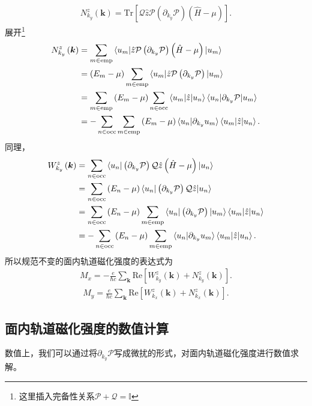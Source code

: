 \documentclass[10pt, oneside]{article}
\newcommand{\pa}{\partial}
\newcommand{\mr}[1]{\mathrm{#1}}
\newcommand{\p}[1]{\left(#1\right)}
\newcommand{\bb}[1]{\left[#1\right]}
\begin{document}
\begin{align}
	\boxed{
			N^{z}_{k_y} \p{\bm{k}} = \mr{Tr} \bb{\mathcal{Q} \hat{z} \mathcal{P}  \p{\pa_{k_y} \mathcal{P}} \p{\hat{H} - \mu} }
	}.
\end{align}
展开\footnote{这里插入完备性关系\(\mathcal{P} + \mathcal{Q} = \mathbb{I}\)}
\begin{align}
	\begin{split}
		N^{z}_{k_y} \p{\bm{k}} & = \sum_{m \in \mr{emp}} \braket{u_m |\hat{z} \mathcal{P} \p{\pa_{k_y} \mathcal{P}} \p{\hat{H} - \mu} | u_m} \\
		& = \p{E_m - \mu} \sum_{m \in \mr{emp}} \braket{u_m |\hat{z} \mathcal{P} \p{\pa_{k_y} \mathcal{P}} | u_m} \\
		& =  \sum_{m \in \mr{emp}}  \p{E_m - \mu}  \sum_{n \in \mr{occ}} \braket{u_m | \hat{z} | u_n} \braket{u_n | \pa_{k_y} \mathcal{P} | u_m} \\
		& =  - \sum_{n \in \mr{occ}} \sum_{m \in \mr{emp}}  \p{E_m - \mu} \braket{u_n | \pa_{k_y} u_m} \braket{u_m |\hat{z} |u_n}.
	\end{split}
\end{align}
同理，
\begin{align}
	\begin{split}
		W^{z}_{k_y} \p{\bm{k}} & =\sum_{n \in \mr{occ}} \braket{u_n | \p{\pa_{k_y} \mathcal{P}} \mathcal{Q} \hat{z}  \p{\hat{H} - \mu} |u_n} \\
		& = \sum_{n \in \mr{occ}} \p{E_n - \mu} \braket{u_n | \p{\pa_{k_y} \mathcal{P}} \mathcal{Q} \hat{z} |u_n}  \\
		& = \sum_{n \in \mr{occ}} \p{E_n - \mu}  \sum_{m \in \mr{emp}}  \braket{u_n | \p{\pa_{k_y} \mathcal{P}} | u_m } \braket{u_m | \hat{z} | u_{n}} \\
		& = - \sum_{n \in \mr{occ}} \p{E_n - \mu}  \sum_{m \in \mr{emp}}  \braket{u_n | \pa_{k_y}  u_m } \braket{u_m | \hat{z} | u_{n}} .
	\end{split}
\end{align}
所以规范不变的面内轨道磁化强度的表达式为
\begin{align}
	\boxed{
		M_{x} = - \frac{e}{\hbar c} \sum_{\bm{k}} \mr{Re} \bb{W^{z}_{k_y} \p{\bm{k}} + N^{z}_{k_y} \p{\bm{k}} }
	}.
\end{align}
\begin{align}
	\boxed{
		M_{y} = \frac{e}{\hbar c} \sum_{\bm{k}} \mr{Re}  \bb{W^{z}_{k_x} \p{\bm{k}} + N^{z}_{k_x} \p{\bm{k}} }
	}.
\end{align}

\subsection{面内轨道磁化强度的数值计算}
数值上，我们可以通过将\(\partial_{k_y} \mathcal{P }	\)写成微扰的形式，对面内轨道磁化强度进行数值求解。
\end{document}
